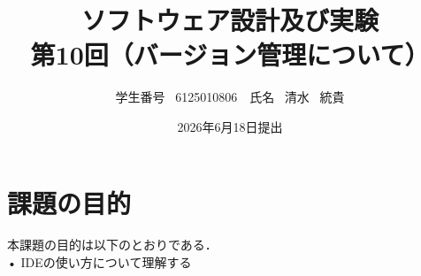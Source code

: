 \documentclass[dvipdfmx]{jsarticle}
\title{ソフトウェア設計及び実験\\第10回（バージョン管理について）}
\author{学生番号 \ 6125010806　氏名 \ 清水 \ 統貴}
\date{2026年6月18日提出}
\begin{document}
\maketitle

\section{課題の目的}
%
本課題の目的は以下のとおりである．\\
• IDEの使い方について理解する\\

\end{document}

